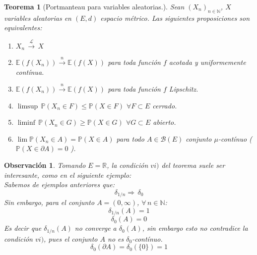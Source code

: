 \documentclass[a4paper]{article}
\newtheorem{teorema}{Teorema}
\numberwithin{equation}{subsection}
\newtheorem{obs}{Observación}
\def\R{\mathbb R}
\def\N{\mathbb N}
\def\E{\mathbb E}
\newcommand{\pb}{\mathbb{P}}
\begin{document}
\begin{teorema}[Portmanteau para variables aleatorias.] Sean $(X_n)_{n\in\N}$, $X$ variables aleatorias en $(E,d)$ espacio métrico. Las siguientes proposiciones son equivalentes:
\begin{enumerate}
    \item[i)] $X_n\,\xrightarrow{\mathcal{L}}\,X$
    \item[ii)] $\E(f(X_n)) \xrightarrow{\,\,n\,\,}\E(f(X))$ para toda función $f$ acotada y uniformemente contínua.
    \item[iii)] $\E(f(X_n)) \xrightarrow{\,\,n\,\,}\E(f(X))$ para toda función $f$ Lipschitz.
    \item[iv)] $\limsup\,\pb(X_n \in F) \leq \pb(X\in F)$ $\forall F\subset E$ cerrado.
    \item[v)] $\liminf\,\pb(X_n \in G) \geq \pb(X \in G)$ $\forall G\subset E$ abierto.
    \item[vi)] $\lim \pb(X_n \in A) = \pb(X\in A)$ para todo $A\in \mathcal{B}(E)$ conjunto $\mu$-contínuo ( $\pb(X \in \partial A) = 0$ ).
\end{enumerate}
\end{teorema}

\begin{obs} Tomando $E=\R$, la condición $vi)$ del teorema suele ser interesante, como en el siguiente ejemplo:\\ Sabemos de ejemplos anteriores que:
\[\delta_{1/n}\Rightarrow \,\delta_{0}\]
Sin embargo, para el conjunto $A=(0,\infty)$, $\forall\,n\in\N$:
\[\delta_{1/n}(A) = 1\]
\[\delta_{0}(A) = 0\]
Es decir que $\delta_{1/n}(A)$ no converge a $\delta_{0}(A)$, sin embargo esto no contradice la condición $vi)$, pues el conjunto $A$ no es $\delta_0$-contínuo.
\[\delta_{0}(\partial A) = \delta_{0}(\{0\}) = 1\]
\end{obs}
\end{document}
